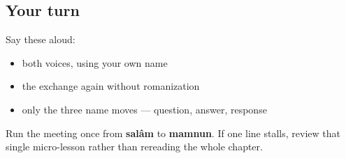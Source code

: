 \subsection*{Your turn}
Say these aloud:

\begin{itemize}
\raggedright
  \item both voices, using your own name
  \item the exchange again without romanization
  \item only the three name moves — question, answer, response
\end{itemize}

\begin{tcolorbox}[breakable,colback=teal!4,colframe=teal!35!black,title={Before you move on}]
Run the meeting once from \textbf{salâm} to \textbf{mamnun}. If one line stalls, review that single micro-lesson rather than rereading the whole chapter.
\end{tcolorbox}
